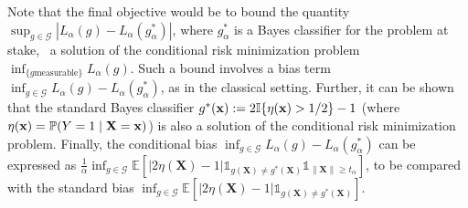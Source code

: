 Note that the final objective would be   to bound the quantity 
$\sup_{g\in \mathcal{G}}| {L}_{\alpha}(g)- L_{\alpha}(g^*_\alpha)  |$,
where $g^*_\alpha$ is a Bayes classifier for the problem at stake,
\ie~a  solution of the conditional risk  minimization problem  $\inf_{\{ g \text{
    measurable}\}} L_\alpha(g)$. Such a bound involves a  bias term $ \inf_{g\in
    \mathcal{G}}L_\alpha(g)-L_\alpha(g_\alpha^*)$, as in the classical
  setting. Further, it  can  be shown that the standard Bayes classifier
  $g^*(\mathbf x) := 2\mathbb{I}\{\eta(\mathbf{x})>1/2\}-1$ (where $\eta(\mathbf
  x) =
  \mathbb{P}(Y=1\; |\; \mathbf X=\mathbf x)$) is also   a solution of the conditional
  risk minimization problem. 
 Finally,  the conditional bias
 $ \inf_{g\in \mathcal{G}}L_\alpha(g)-L_\alpha(g_\alpha^*)$ can
 be expressed as
$\frac{1}{\alpha}\inf_{g \in \mathcal{G}} \mathbb{E} \left [ |2
  \eta(\mathbf{X})-1|\mathds{1}_{g(\mathbf{X}) \neq g^*(\mathbf{X})
  }\mathds{1}_{ \|\mathbf{X}\| \ge t_\alpha}\right] $, to be compared
with the standard bias $\inf_{g \in \mathcal{G}} \mathbb{E} \left [ |2
  \eta(\mathbf{X})-1|\mathds{1}_{g(\mathbf{X}) \neq g^*(\mathbf{X})
  }\right]$.

